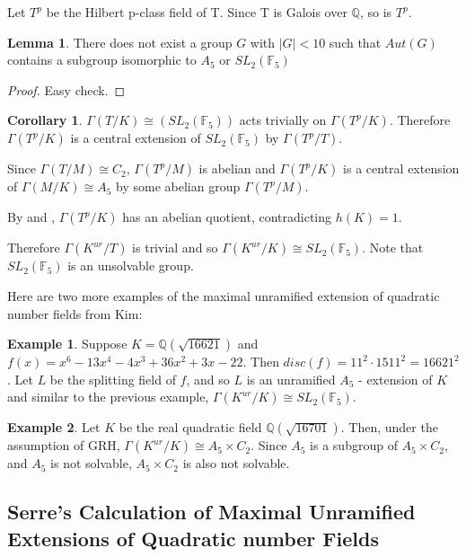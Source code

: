 \documentclass[12pt]{extarticle}
\newcommand{\Q}{\mathbb{Q}}
\newcommand{\<}{\langle}
\renewcommand{\>}{\rangle}
\theoremstyle{definition}
\newtheorem{corollary}{Corollary}
\newtheorem{example}{Example}
\newtheorem{lemma}{Lemma}
\begin{document}
Let $T^p$ be the Hilbert p-class field of T. Since T is Galois over $\Q$, so is $T^p$.
\begin{lemma}
There does not exist a group $G$ with $|G| < 10 $ such that $Aut(G)$ contains a subgroup isomorphic to $A_5$ or $SL_2(\mathbb{F}_5)$
\end{lemma}
\begin{proof}
Easy check. 
\end{proof}
\begin{corollary}
\label{cor:trivially}
 $\Gamma(T/K) \cong (SL_2(\mathbb{F}_5))$ acts trivially on $\Gamma(T^p/K)$. Therefore 
$\Gamma(T^p/K)$ is a central extension of $SL_2(\mathbb{F}_5)$ by $\Gamma(T^p/T)$. \par
Since $\Gamma(T/M) \cong C_2$, $\Gamma(T^p/M)$ is abelian and $\Gamma(T^p/K)$ is a central extension of $\Gamma(M/K) \cong A_5$ by some abelian group $\Gamma(T^p/M)$.
\end{corollary}
 By  and , $\Gamma(T^p/K)$ has an abelian quotient, contradicting $h(K)=1$. \par
Therefore $\Gamma(K^{ur}/T)$ is trivial and so $\Gamma(K^{ur}/K) \cong SL_2(\mathbb{F}_5)$. Note that $SL_2(\mathbb{F}_5)$ is an unsolvable group. 
 \par
Here are two more examples of the maximal unramified extension of quadratic number fields from Kim:
\begin{example}
Suppose $K = \Q(\sqrt{16621})$ and $f(x) = x^6-13x^4-4x^3 +36x^2 +3x-22$. Then $disc(f) = 11^2 \cdot 1511^2 = 16621^2$. Let $L$ be the splitting field of $f$, and so $L$ is an unramified $A_5$ - extension of $K$ and similar to the previous example, $\Gamma(K^{ur}/K) \cong SL_2(\mathbb{F}_5)$.
\end{example}
\begin{example}
Let $K$ be the real quadratic field $\Q(\sqrt{16701})$. Then, under the assumption of GRH, $\Gamma(K^{ur}/K) \cong A_5 \times C_2$. Since $A_5$ is a subgroup of $A_5 \times C_2$, and $A_5$ is not solvable, $A_5 \times C_2$ is also not solvable.
\end{example}
 


\subsection{Serre's Calculation of Maximal Unramified Extensions of Quadratic number Fields}
\end{document}
